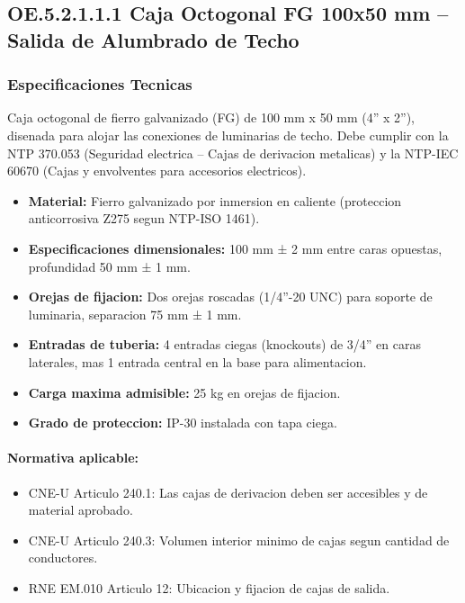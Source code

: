 \subsection{OE.5.2.1.1.1 Caja Octogonal FG 100x50 mm -- Salida de Alumbrado de Techo}

\subsubsection{Especificaciones Tecnicas}

Caja octogonal de fierro galvanizado (FG) de 100 mm x 50 mm (4'' x 2''), disenada para alojar las conexiones de luminarias de techo. Debe cumplir con la NTP 370.053 (Seguridad electrica -- Cajas de derivacion metalicas) y la NTP-IEC 60670 (Cajas y envolventes para accesorios electricos).

\begin{itemize}[nosep]
  \item \textbf{Material:} Fierro galvanizado por inmersion en caliente (proteccion anticorrosiva Z275 segun NTP-ISO 1461).
  \item \textbf{Especificaciones dimensionales:} 100 mm ± 2 mm entre caras opuestas, profundidad 50 mm ± 1 mm.
  \item \textbf{Orejas de fijacion:} Dos orejas roscadas (1/4''-20 UNC) para soporte de luminaria, separacion 75 mm ± 1 mm.
  \item \textbf{Entradas de tuberia:} 4 entradas ciegas (knockouts) de 3/4'' en caras laterales, mas 1 entrada central en la base para alimentacion.
  \item \textbf{Carga maxima admisible:} 25 kg en orejas de fijacion.
  \item \textbf{Grado de proteccion:} IP-30 instalada con tapa ciega.
\end{itemize}

\paragraph{Normativa aplicable:}
\begin{itemize}[nosep]
  \item CNE-U Articulo 240.1: Las cajas de derivacion deben ser accesibles y de material aprobado.
  \item CNE-U Articulo 240.3: Volumen interior minimo de cajas segun cantidad de conductores.
  \item RNE EM.010 Articulo 12: Ubicacion y fijacion de cajas de salida.
\end{itemize}

